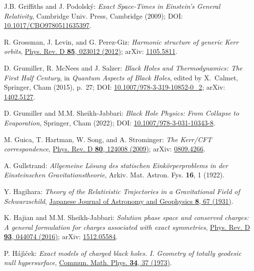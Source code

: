 \begin{thebibliography}{123}
J.B. Griffiths and J. Podolský:
{\em Exact Space-Times in Einstein's General Relativity},
Cambridge Univ. Press, Cambridge (2009);
DOI: \href{https://doi.org/10.1017/CBO9780511635397}{10.1017/CBO9780511635397}.

R. Grossman, J. Levin, and G. Perez-Giz:
{\em Harmonic structure of generic Kerr orbits},
\href{https://doi.org/10.1103/PhysRevD.85.023012}{Phys. Rev. D {\bf 85}, 023012 (2012)};
arXiv: \href{https://arxiv.org/abs/1105.5811}{1105.5811}.

D. Grumiller, R. McNees and J. Salzer:
{\em Black Holes and Thermodynamics: The First Half Century},
in {\em Quantum Aspects of Black Holes}, edited by X.~Calmet,
Springer, Cham (2015), p.~27;
DOI: \href{https://doi.org/10.1007/978-3-319-10852-0_2}{10.1007/978-3-319-10852-0\_2};
arXiv: \href{https://arxiv.org/abs/1402.5127}{1402.5127}.

D. Grumiller and M.M. Sheikh-Jabbari:
{\em Black Hole Physics: From Collapse to Evaporation},
Springer, Cham (2022);
DOI: \href{https://doi.org/10.1007/978-3-031-10343-8}{10.1007/978-3-031-10343-8}.

M. Guica, T. Hartman, W. Song, and A. Strominger:
{\em The Kerr/CFT correspondence},
\href{https://doi.org/10.1103/PhysRevD.80.124008}{Phys. Rev. D {\bf 80}, 124008 (2009)};
arXiv: \href{https://arxiv.org/abs/0809.4266}{0809.4266}.

A. Gullstrand:
\emph{Allgemeine Lösung des statischen Einkörperproblems in der Einsteinschen Gravitationstheorie},
Arkiv. Mat. Astron. Fys. {\bf 16}, 1 (1922).

Y. Hagihara:
\emph{Theory of the Relativistic Trajectories in a Gravitational Field of Schwarzschild},
\href{https://ui.adsabs.harvard.edu/abs/1930JaJAG...8...67H}{Japanese Journal of Astronomy and Geophysics {\bf 8}, 67 (1931)}.

K. Hajian and M.M. Sheikh-Jabbari:
{\em Solution phase space and conserved charges: A general formulation for charges associated with exact symmetries},
\href{https://doi.org/10.1103/PhysRevD.93.044074}{Phys. Rev. D {\bf 93}, 044074 (2016)};
arXiv: \href{https://arxiv.org/abs/1512.05584}{1512.05584}.

P. H\'aj\'{\i}\v{c}ek:
{\em Exact models of charged black holes. I. Geometry
of totally geodesic null hypersurface},
\href{https://doi.org/10.1007/BF01646541}{Commun. Math. Phys. {\bf 34}, 37 (1973)}.


\end{thebibliography}
